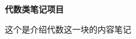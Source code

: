 \newpage
\begin{center}
	\faSendO  \textbf{代数类笔记项目} \faSendO \\
\end{center}

这个是介绍代数这一块的内容笔记

\vspace{-5pt}